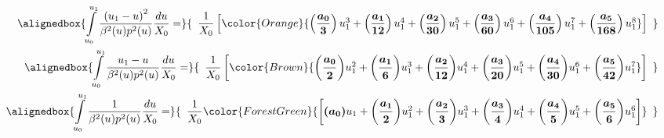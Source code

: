 \documentclass[a4paper,landscape]{article}
\begin{document}
\begin{align*}
    \alignedbox
    {
        \int\limits_{u_0}^{u_1} \dfrac{\left(u_1-u\right)^2}{\beta^2(u) p^2(u)}\dfrac{du}{X_0} =
    }
    {
        \begin{array}{lll}
            \dfrac{1}{X_0}
            \left[
                \color{Orange}
                {
                    \left(\dfrac{\boldsymbol{a_0}}{\boldsymbol{3}}\right)u_1^3
                    + \left(\dfrac{\boldsymbol{a_1}}{\boldsymbol{12}}\right)u_1^4
                    + \left(\dfrac{\boldsymbol{a_2}}{\boldsymbol{30}}\right)u_1^5
                    + \left(\dfrac{\boldsymbol{a_3}}{\boldsymbol{60}}\right)u_1^6
                    + \left(\dfrac{\boldsymbol{a_4}}{\boldsymbol{105}}\right)u_1^7
                    + \left(\dfrac{\boldsymbol{a_5}}{\boldsymbol{168}}\right)u_1^8
                }
            \right]
        \end{array}
    }
    \\
    \alignedbox
    {
        \int\limits_{u_0}^{u_1} \dfrac{u_1-u}{\beta^2(u) p^2(u)}\dfrac{du}{X_0} =
    }
    {
        \begin{array}{lll}
            \dfrac{1}{X_0}
                \left[
                    \color{Brown}
                    {
                          \boldsymbol{\left(\dfrac{a_0}{2}\right)}u_1^2
                        + \boldsymbol{\left(\dfrac{a_1}{6}\right)}u_1^3
                        + \boldsymbol{\left(\dfrac{a_2}{12}\right)}u_1^4
                        + \boldsymbol{\left(\dfrac{a_3}{20}\right)}u_1^5
                        + \boldsymbol{\left(\dfrac{a_4}{30}\right)}u_1^6
                        + \boldsymbol{\left(\dfrac{a_5}{42}\right)}u_1^7
                    }
                \right]
        \end{array}
    }
    \\
    \alignedbox
    {
        \int\limits_{u_0}^{u_1} \dfrac{1}{\beta^2(u) p^2(u)}\dfrac{du}{X_0} =
    }
    {
        \begin{array}{lll}
            \dfrac{1}{X_0}
            \color{ForestGreen}
            {
                \left[
                      \boldsymbol{\left(a_0\right)}u_1
                    + \boldsymbol{\left(\dfrac{a_1}{2}\right)} u_1^2
                    + \boldsymbol{\left(\dfrac{a_2}{3}\right)} u_1^3
                    + \boldsymbol{\left(\dfrac{a_3}{4}\right)} u_1^4
                    + \boldsymbol{\left(\dfrac{a_4}{5}\right)} u_1^5
                    + \boldsymbol{\left(\dfrac{a_5}{6}\right)} u_1^6
                \right]
            }
        \end{array}
}
\end{align*}
\end{document}
